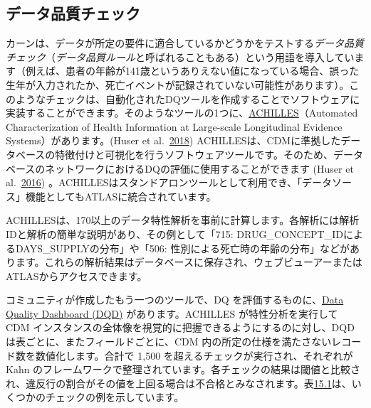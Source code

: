 \documentclass[
  11pt]{book}
\theoremstyle{definition}
\theoremstyle{definition}
\theoremstyle{definition}
\theoremstyle{definition}
\theoremstyle{remark}
\begin{document}
 

\subsection{データ品質チェック}\label{ux30c7ux30fcux30bfux54c1ux8ceaux30c1ux30a7ux30c3ux30af}

 

カーンは、データが所定の要件に適合しているかどうかをテストする\emph{データ品質チェック}（\emph{データ品質ルール}と呼ばれることもある）という用語を導入しています（例えば、患者の年齢が141歳というありえない値になっている場合、誤った生年が入力されたか、死亡イベントが記録されていない可能性があります）。このようなチェックは、自動化されたDQツールを作成することでソフトウェアに実装することができます。そのようなツールの1つに、\href{https://github.com/OHDSI/Achilles}{ACHILLES}（Automated Characterization of Health Information at Large-scale Longitudinal Evidence Systems）があります。(Huser et al.~\href{https://ohdsi.github.io/TheBookOfOhdsi/DataQuality.html\#ref-huser_methods_2018}{2018}) ACHILLESは、CDMに準拠したデータベースの特徴付けと可視化を行うソフトウェアツールです。そのため、データベースのネットワークにおけるDQの評価に使用することができます (Huser et al.~\href{https://ohdsi.github.io/TheBookOfOhdsi/DataQuality.html\#ref-huser_multisite_2016}{2016}) 。ACHILLESはスタンドアロンツールとして利用でき、「データソース」機能としてもATLASに統合されています。

ACHILLESは、170以上のデータ特性解析を事前に計算します。各解析には解析IDと解析の簡単な説明があり、その例として「715: DRUG\_CONCEPT\_IDによるDAYS\_SUPPLYの分布」や「506: 性別による死亡時の年齢の分布」などがあります。これらの解析結果はデータベースに保存され、ウェブビューアーまたはATLASからアクセスできます。

コミュニティが作成したもう一つのツールで、DQ を評価するものに、\href{https://github.com/OHDSI/DataQualityDashboard}{Data Quality Dashboard (DQD)} があります。ACHILLES が特性分析を実行して CDM インスタンスの全体像を視覚的に把握できるようにするのに対し、DQD は表ごとに、またフィールドごとに、CDM 内の所定の仕様を満たさないレコード数を数値化します。合計で 1,500 を超えるチェックが実行され、それぞれが Kahn のフレームワークで整理されています。各チェックの結果は閾値と比較され、違反行の割合がその値を上回る場合は不合格とみなされます。表\href{https://ohdsi.github.io/TheBookOfOhdsi/DataQuality.html\#tab:dqdExamples}{15.1}は、いくつかのチェックの例を示しています。
\end{document}
